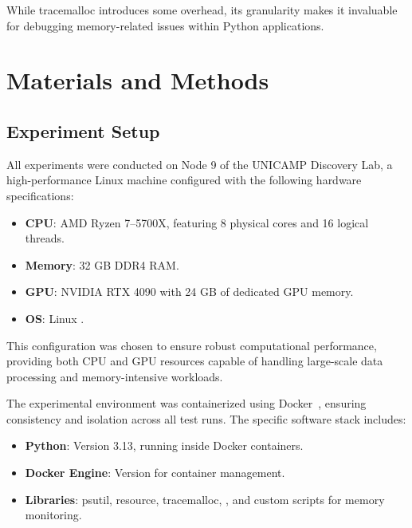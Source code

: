 While tracemalloc introduces some overhead, its granularity makes it invaluable for debugging memory-related issues within Python applications.


\section{Materials and Methods}
\label{sec:mmc-materials-methods}

\subsection{Experiment Setup}
\label{subsec:mmc-experiment-setup}

All experiments were conducted on Node 9 of the \ac{UNICAMP} Discovery Lab, a high-performance Linux machine configured with the following hardware specifications:

\begin{itemize}
    \item \textbf{\ac{CPU}}:
    AMD Ryzen 7--5700X, featuring 8 physical cores and 16 logical threads.

    \item \textbf{Memory}:
    32 GB \ac{DDR4} \ac{RAM}.

    \item \textbf{GPU}:
    NVIDIA RTX 4090 with 24 \ac{GB} of dedicated \ac{GPU} memory.

    \item \textbf{\ac{OS}}:
    Linux .
\end{itemize}

This configuration was chosen to ensure robust computational performance, providing both \ac{CPU} and \ac{GPU} resources capable of handling large-scale data processing and memory-intensive workloads.

The experimental environment was containerized using Docker~\cite{docker}, ensuring consistency and isolation across all test runs.
The specific software stack includes:

\begin{itemize}
    \item \textbf{Python}:
    Version 3.13, running inside Docker containers.

    \item \textbf{Docker Engine}:
    Version  for container management.

    \item \textbf{Libraries}:
    psutil, resource, tracemalloc, , and custom scripts for memory monitoring.
\end{itemize}

